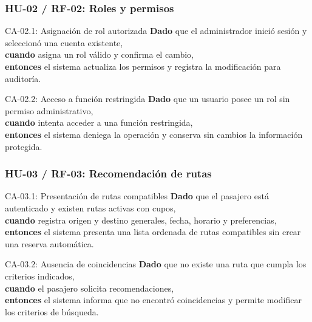 \documentclass[12pt,a4paper]{article}
\begin{document}
\subsubsection{HU-02 / RF-02: Roles y permisos}

\begin{GherkinBox}{CA-02.1: Asignación de rol autorizada}
\textbf{Dado} que el administrador inició sesión y seleccionó una cuenta existente,\\
\textbf{cuando} asigna un rol válido y confirma el cambio,\\
\textbf{entonces} el sistema actualiza los permisos y registra la modificación para auditoría.
\end{GherkinBox}

\begin{GherkinBox}{CA-02.2: Acceso a función restringida}
\textbf{Dado} que un usuario posee un rol sin permiso administrativo,\\
\textbf{cuando} intenta acceder a una función restringida,\\
\textbf{entonces} el sistema deniega la operación y conserva sin cambios la información protegida.
\end{GherkinBox}

\subsubsection{HU-03 / RF-03: Recomendación de rutas}

\begin{GherkinBox}{CA-03.1: Presentación de rutas compatibles}
\textbf{Dado} que el pasajero está autenticado y existen rutas activas con cupos,\\
\textbf{cuando} registra origen y destino generales, fecha, horario y preferencias,\\
\textbf{entonces} el sistema presenta una lista ordenada de rutas compatibles sin crear una reserva automática.
\end{GherkinBox}

\begin{GherkinBox}{CA-03.2: Ausencia de coincidencias}
\textbf{Dado} que no existe una ruta que cumpla los criterios indicados,\\
\textbf{cuando} el pasajero solicita recomendaciones,\\
\textbf{entonces} el sistema informa que no encontró coincidencias y permite modificar los criterios de búsqueda.
\end{GherkinBox}
\end{document}
